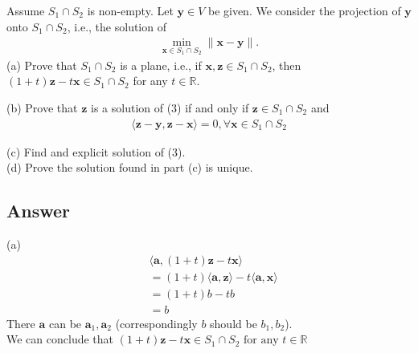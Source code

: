 \documentclass[a4paper,12pt]{article}
\newcommand{\R}{\mathbb{R}}
\begin{document}
Assume \(S_1 \cap S_2\) is non-empty. Let \(\bm{y} \in V\) be given. We consider the projection of \(\bm{y}\) onto \(S_1 \cap S_2\), i.e.,
the solution of 
\begin{align}
    \min_{\bm{x} \in S_1 \cap S_2}\|\bm{x} - \bm{y}\|.
\end{align}
(a) Prove that \(S_1 \cap S_2\) is a plane, i.e., if \(\bm{x}, \bm{z} \in S_1 \cap S_2\), then \((1 + t)\bm{z} - t\bm{x} \in S_1 \cap S_2\) for any \(t \in \R\). 

(b) Prove that \(\bm{z}\) is a solution of (3) if and only if \(\bm{z} \in S_1 \cap S_2\) and 
\begin{align}
    \langle \bm{z} - \bm{y}, \bm{z} - \bm{x}\rangle = 0, \forall \bm{x} \in S_1 \cap S_2
\end{align}

(c) Find and explicit solution of (3). \\

(d) Prove the solution found in part (c) is unique. \\
\subsection*{Answer}
(a)
\begin{align*}
     &\langle \bm{a}, (1+t)\bm{z} - t\bm{x}\rangle \\
     &= (1 + t)\langle \bm{a}, \bm{z}\rangle - t\langle \bm{a}, \bm{x}\rangle \\
     &= (1 + t)b - t b \\
     &= b
\end{align*}
There \(\bm{a}\) can be \(\bm{a}_1, \bm{a}_2\) (correspondingly \(b\) should be \(b_1, b_2\)). \\

We can conclude that \((1 + t) \bm{z} - t \bm{x} \in S_1 \cap S_2 \text{ for any } t \in \R\) 
\end{document}
